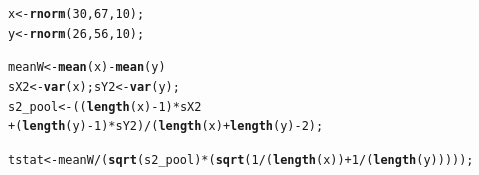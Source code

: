 \documentclass{beamer}\usepackage[]{graphicx}\usepackage[]{color}
\makeatletter
\newcommand{\hlnum}[1]{\textcolor[rgb]{0.2,0.2,0.2}{#1}}%
\newcommand{\hlopt}[1]{\textcolor[rgb]{0.102,0.102,0.102}{#1}}%
\newcommand{\hlstd}[1]{\textcolor[rgb]{0.102,0.102,0.102}{#1}}%
\newcommand{\hlkwb}[1]{\textcolor[rgb]{0.102,0.102,0.102}{#1}}%
\newcommand{\hlkwd}[1]{\textcolor[rgb]{0.102,0.102,0.102}{\textbf{#1}}}%
\newenvironment{kframe}{%
 \def\at@end@of@kframe{}%
 \ifinner\ifhmode%
  \def\at@end@of@kframe{\end{minipage}}%
  \begin{minipage}{\columnwidth}%
 \fi\fi%
 \def\FrameCommand##1{\hskip\@totalleftmargin \hskip-\fboxsep
 \colorbox{shadecolor}{##1}\hskip-\fboxsep
     \hskip-\linewidth \hskip-\@totalleftmargin \hskip\columnwidth}%
 \MakeFramed {\advance\hsize-\width
   \@totalleftmargin\z@ \linewidth\hsize
   \@setminipage}}%
 {\par\unskip\endMakeFramed%
 \at@end@of@kframe}
\newenvironment{knitrout}{}{} %
\renewenvironment{knitrout}{\begin{spacing}{0.75}\begin{tiny}}{\end{tiny}\end{spacing}}
\makeatother
\begin{document}
\begin{frame}[fragile]

\begin{knitrout}\small
{}\color{fgcolor}\begin{kframe}
\begin{alltt}
\hlstd{x} \hlkwb{<-} \hlkwd{rnorm}\hlstd{(}\hlnum{30}\hlstd{,} \hlnum{67}\hlstd{,} \hlnum{10}\hlstd{);}
\hlstd{y} \hlkwb{<-} \hlkwd{rnorm}\hlstd{(}\hlnum{26}\hlstd{,} \hlnum{56}\hlstd{,} \hlnum{10}\hlstd{);}

\hlstd{meanW} \hlkwb{<-} \hlkwd{mean}\hlstd{(x)} \hlopt{-} \hlkwd{mean}\hlstd{(y)}
\hlstd{sX2} \hlkwb{<-} \hlkwd{var}\hlstd{(x); sY2} \hlkwb{<-} \hlkwd{var}\hlstd{(y);}
\hlstd{s2_pool} \hlkwb{<-} \hlstd{((}\hlkwd{length}\hlstd{(x)}\hlopt{-}\hlnum{1}\hlstd{)}\hlopt{*}\hlstd{sX2}
            \hlopt{+} \hlstd{(}\hlkwd{length}\hlstd{(y)}\hlopt{-}\hlnum{1}\hlstd{)}\hlopt{*}\hlstd{sY2)}\hlopt{/}\hlstd{(}\hlkwd{length}\hlstd{(x)}\hlopt{+}\hlkwd{length}\hlstd{(y)}\hlopt{-}\hlnum{2}\hlstd{);}

\hlstd{tstat} \hlkwb{<-} \hlstd{meanW}\hlopt{/} \hlstd{(}\hlkwd{sqrt}\hlstd{(s2_pool)}\hlopt{*}\hlstd{(}\hlkwd{sqrt}\hlstd{(}\hlnum{1}\hlopt{/}\hlstd{(}\hlkwd{length}\hlstd{(x))} \hlopt{+} \hlnum{1}\hlopt{/}\hlstd{(}\hlkwd{length}\hlstd{(y)))));}
\end{alltt}
\end{kframe}
\end{knitrout}

\end{frame}
\end{document}
